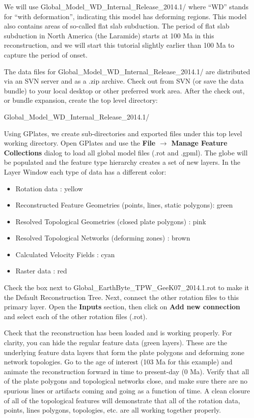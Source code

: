\documentclass[letterpaper,12pt]{article}
\newcommand{\gp}[1]{\textbf{#1}}
\newcommand{\gplatesmodel}{Global\_Model\_WD\_Internal\_Release\_2014.1/ }
\newcommand{\gplatesmodelrot}{Global\_EarthByte\_TPW\_GeeK07\_2014.1.rot }
\begin{document}
We will use \gplatesmodel where ``WD'' stands for ``with deformation'', indicating this model has deforming regions.  This model also contains areas of so-called flat slab subduction.  The period of flat slab subduction in North America (the Laramide) starts at 100 Ma in this reconstruction, and we will start this tutorial slightly earlier than 100 Ma to capture the period of onset.

The data files for \gplatesmodel are distributed via an SVN server and as a .zip archive.  
Check out from SVN (or save the data bundle) to your local desktop or other preferred work area.  
After the check out, or bundle expansion, create the top level directory:

\gplatesmodel

Using GPlates, we create sub-directories and exported files under this top level working directory.  
Open GPlates and use the \gp{File $\rightarrow$ Manage Feature Collections} dialog to load all global model files (.rot and .gpml).  
The globe will be populated and the feature type hierarchy creates a set of new layers.  
In the Layer Window each type of data has a different color: 

\begin{itemize}
\item Rotation data : yellow
\item Reconstructed Feature Geometries (points, lines, static polygons): green
\item Resolved Topological Geometries (closed plate polygons) : pink 
\item Resolved Topological Networks (deforming zones) : brown 
\item Calculated Velocity Fields : cyan
\item Raster data : red 
\end{itemize}


Check the box next to \gplatesmodelrot to make it the Default Reconstruction Tree. 
Next, connect the other rotation files to this primary layer.  Open the \gp{Inputs} section, then click on \gp{Add new connection} and select each of the other rotation files (.rot). 

Check that the reconstruction has been loaded and is working properly. For clarity, you can hide the regular feature data (green layers).  These are the underlying feature data layers that form the plate polygons and deforming zone network topologies. Go to the age of interest (103 Ma for this example) and animate the reconstruction forward in time to present-day (0 Ma).  Verify that all of the plate polygons and topological networks close, and make sure there are no spurious lines or artifacts coming and going as a function of time. A clean closure of all of the topological features will demonstrate that all of the rotation data, points, lines polygons, topologies, etc. are all working together properly. 
\end{document}
